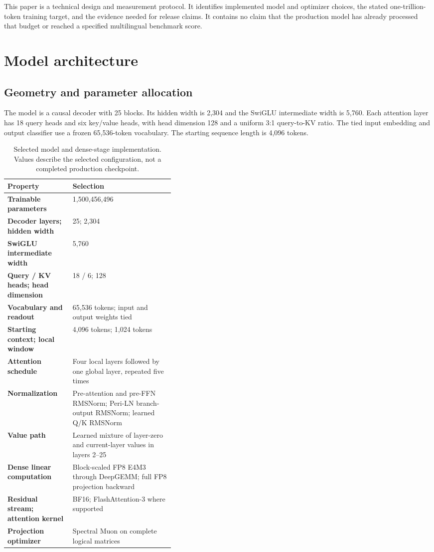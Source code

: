 \documentclass[11pt]{article}
\begin{document}
This paper is a technical design and measurement protocol. It identifies
implemented model and optimizer choices, the stated one-trillion-token
training target, and the evidence needed for release claims. It contains no
claim that the production model has already processed that budget or reached
a specified multilingual benchmark score.

\section{Model architecture}

\subsection{Geometry and parameter allocation}

The model is a causal decoder with 25 blocks. Its hidden width is 2,304 and
the SwiGLU intermediate width is 5,760. Each attention layer has 18 query
heads and six key/value heads, with head dimension 128 and a uniform 3:1
query-to-KV ratio. The tied input embedding and output classifier use a frozen
65,536-token vocabulary. The starting sequence length is 4,096 tokens.

\begin{table}[ht]
\centering
\caption{Selected model and dense-stage implementation. Values describe the
selected configuration, not a completed production checkpoint.}
\label{tab:model}
\small
\begin{tabularx}{\linewidth}{@{}>{\bfseries}p{0.39\linewidth}X@{}}
\toprule
Property & Selection \\
\midrule
Trainable parameters & 1,500,456,496 \\
Decoder layers; hidden width & 25; 2,304 \\
SwiGLU intermediate width & 5,760 \\
Query / KV heads; head dimension & 18 / 6; 128 \\
Vocabulary and readout & 65,536 tokens; input and output weights tied \\
Starting context; local window & 4,096 tokens; 1,024 tokens \\
Attention schedule & Four local layers followed by one global layer, repeated five times \\
Normalization & Pre-attention and pre-FFN RMSNorm; Peri-LN branch-output RMSNorm; learned Q/K RMSNorm \\
Value path & Learned mixture of layer-zero and current-layer values in layers 2--25 \\
Dense linear computation & Block-scaled FP8 E4M3 through DeepGEMM; full FP8 projection backward \\
Residual stream; attention kernel & BF16; FlashAttention-3 where supported \\
Projection optimizer & Spectral Muon on complete logical matrices \\
\bottomrule
\end{tabularx}
\end{table}
\end{document}
